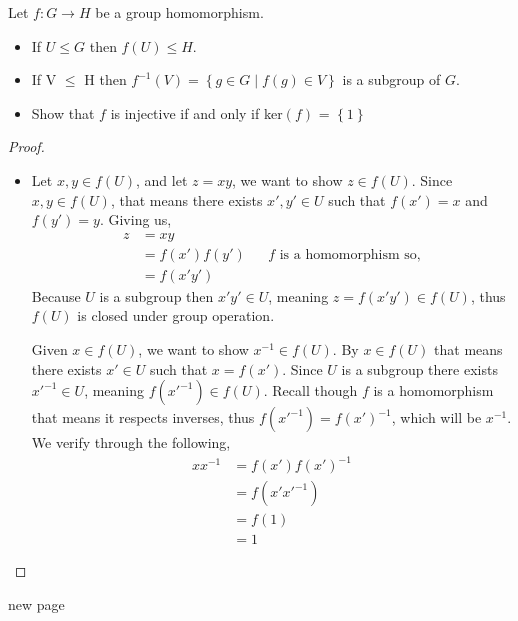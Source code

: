 \documentclass[10pt]{article}
\newenvironment{problem}[2][Problem\!]{\begin{trivlist}
\item[\hskip \labelsep {\bfseries #1}\hskip \labelsep {\bfseries #2.}]}{\end{trivlist}}
\newcommand{\set}[1]{\left\{#1\right\}} %
\renewcommand{\leq}{\leqslant}
\begin{document}
\begin{tcolorbox}
    \begin{problem}{2.7}
        Let $f:G\rightarrow H$ be a group homomorphism. 
        \begin{itemize}
            \item[(a)] If $U \leq G$ then $f(U)\leq H$.
            \item[(b)] If V $\leq$ H then $f^{-1}(V) = \set{g\in G \mid f(g) \in V}$ is a subgroup of $G$.
            \item[(c)] Show that $f$ is injective if and only if ker$(f)$ = $\set{1}$ 
        \end{itemize}
    \end{problem}
\end{tcolorbox}
\begin{proof}
    \begin{itemize}
        \item[(a)] Let $x,y \in f(U)$, and let $z = xy$, we want to show $z\in f(U)$. Since $x,y \in f(U)$, that means there exists $x',y' \in U$ such that $f(x') = x$ and $f(y') = y$. Giving us,
        \begin{align*}
            z &= xy \\
            &= f(x')f(y') &&\text{$f$ is a homomorphism so,} \\
            &= f(x'y') 
        \end{align*} 
        Because $U$ is a subgroup then $x'y' \in U$, meaning $z = f(x'y')\in f(U)$, thus $f(U)$ is closed under group operation.
        
        Given $x\in f(U)$, we want to show $x^{-1}\in f(U)$. By $x\in f(U)$ that means there exists $x'\in U$ such that $x = f(x')$. Since $U$ is a subgroup there exists $x'^{-1} \in U$, meaning $f(x'^{-1})\in f(U)$. Recall though $f$ is a homomorphism that means it respects inverses, thus $f(x'^{-1}) = f(x')^{-1}$, which will be $x^{-1}$. We verify through the following,
        \begin{align*}
            xx^{-1} &= f(x')f(x')^{-1} \\
            &= f(x'x'^{-1}) \\
            &= f(1) \\
            &= 1
        \end{align*}

    \end{itemize}
\end{proof}

\newpage
new page
\end{document}
